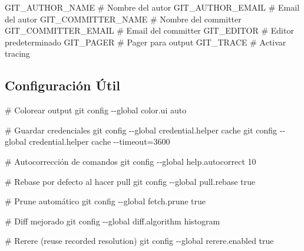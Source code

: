 \documentclass[
  doc,
  floatsintext,
  longtable,
  a4paper,
  nolmodern,
  notxfonts,
  notimes,
  12pt,
  colorlinks=true,linkcolor=blue,citecolor=blue,urlcolor=blue]{apa7}
\newenvironment{Shaded}{\begin{snugshade}}{\end{snugshade}}
\newcommand{\AttributeTok}[1]{\textcolor[rgb]{0.40,0.45,0.13}{#1}}
\newcommand{\CommentTok}[1]{\textcolor[rgb]{0.37,0.37,0.37}{#1}}
\newcommand{\ExtensionTok}[1]{\textcolor[rgb]{0.00,0.23,0.31}{#1}}
\newcommand{\FunctionTok}[1]{\textcolor[rgb]{0.28,0.35,0.67}{#1}}
\newcommand{\NormalTok}[1]{\textcolor[rgb]{0.00,0.23,0.31}{#1}}
\newcommand{\StringTok}[1]{\textcolor[rgb]{0.13,0.47,0.30}{#1}}
\begin{document}
\begin{Shaded}
\begin{Highlighting}[]
\ExtensionTok{GIT\_AUTHOR\_NAME}        \CommentTok{\# Nombre del autor}
\ExtensionTok{GIT\_AUTHOR\_EMAIL}       \CommentTok{\# Email del autor}
\ExtensionTok{GIT\_COMMITTER\_NAME}     \CommentTok{\# Nombre del committer}
\ExtensionTok{GIT\_COMMITTER\_EMAIL}    \CommentTok{\# Email del committer}
\ExtensionTok{GIT\_EDITOR}             \CommentTok{\# Editor predeterminado}
\ExtensionTok{GIT\_PAGER}              \CommentTok{\# Pager para output}
\ExtensionTok{GIT\_TRACE}              \CommentTok{\# Activar tracing}
\end{Highlighting}
\end{Shaded}

\subsection{Configuración Útil}\label{configuraciuxf3n-uxfatil}

\begin{Shaded}
\begin{Highlighting}[]
\CommentTok{\# Colorear output}
\FunctionTok{git}\NormalTok{ config }\AttributeTok{{-}{-}global}\NormalTok{ color.ui auto}

\CommentTok{\# Guardar credenciales}
\FunctionTok{git}\NormalTok{ config }\AttributeTok{{-}{-}global}\NormalTok{ credential.helper cache}
\FunctionTok{git}\NormalTok{ config }\AttributeTok{{-}{-}global}\NormalTok{ credential.helper }\StringTok{\textquotesingle{}cache {-}{-}timeout=3600\textquotesingle{}}

\CommentTok{\# Autocorrección de comandos}
\FunctionTok{git}\NormalTok{ config }\AttributeTok{{-}{-}global}\NormalTok{ help.autocorrect 10}

\CommentTok{\# Rebase por defecto al hacer pull}
\FunctionTok{git}\NormalTok{ config }\AttributeTok{{-}{-}global}\NormalTok{ pull.rebase true}

\CommentTok{\# Prune automático}
\FunctionTok{git}\NormalTok{ config }\AttributeTok{{-}{-}global}\NormalTok{ fetch.prune true}

\CommentTok{\# Diff mejorado}
\FunctionTok{git}\NormalTok{ config }\AttributeTok{{-}{-}global}\NormalTok{ diff.algorithm histogram}

\CommentTok{\# Rerere (reuse recorded resolution)}
\FunctionTok{git}\NormalTok{ config }\AttributeTok{{-}{-}global}\NormalTok{ rerere.enabled true}
\end{Highlighting}
\end{Shaded}
\end{document}
